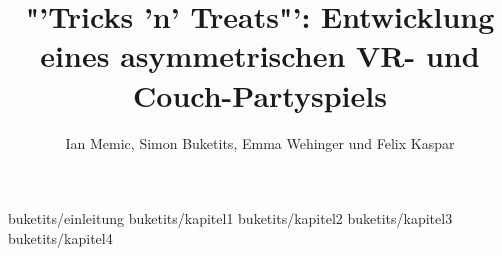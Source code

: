 \documentclass[diplom,german]{hgbthesis}
\begin{document}





\clearpage
\thispagestyle{empty}
\hfill
\clearpage

%	

\title{"'Tricks 'n' Treats"': Entwicklung eines asymmetrischen VR- und Couch-Partyspiels}
\author{Ian Memic, Simon Buketits, Emma Wehinger und Felix Kaspar}

\frontmatter
\maketitle
\tableofcontents


\clearpage
\thispagestyle{empty}
\hfill
\clearpage

\mainmatter         %


 {buketits/einleitung}
 {buketits/kapitel1}
 {buketits/kapitel2}
 {buketits/kapitel3}
 {buketits/kapitel4}
\end{document}
